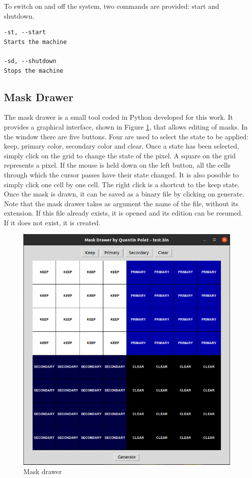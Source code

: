 To switch on and off the system, two commands are provided: start and shutdown.

{\small
\begin{lstlisting}[caption=Start and shutdown commands.]
-st, --start
Starts the machine

-sd, --shutdown
Stops the machine
\end{lstlisting}}

\subsection{Mask Drawer}

The mask drawer is a small tool coded in Python developed for this work. It provides a graphical 
interface, shown in Figure \ref{fig:tools/mask_drawer}, that allows editing of masks. In the window 
there are five buttons. 
Four are used to select the state to be applied: keep, primary color, secondary color and clear. 
Once a state has been selected, simply click on the grid to change the state of the pixel. A square 
on the grid represents a pixel. If the mouse is held down on the left button, all the cells through 
which the cursor passes have their state changed. It is also possible to simply click one cell 
by one cell. The right click is a shortcut to the keep state. Once the mask is drawn, it can be 
saved as a binary file by clicking on generate. Note that the mask drawer takes as argument the 
name of the file, without its extension. If this file already exists, it is opened and its edition 
can be resumed. If it does not exist, it is created. 

\begin{figure}[H]
    \centering
    \includegraphics[scale=0.5]{Chapter7-Tools-Demos/res/mask_drawer.png}
    \caption{Mask drawer}
    \label{fig:tools/mask_drawer}
\end{figure}


